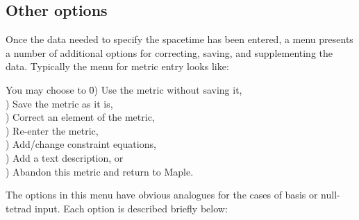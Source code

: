 \documentclass{article}
\begin{document}
\subsection{Other options}
%
Once the data needed to specify the spacetime has been entered, a menu presents
a number of additional options for correcting, saving, and supplementing the
data. Typically the menu for metric entry looks like:
\begin{ttfamily}
  \begin{tabbing}
    You may choose to \= 0) Use the metric without saving it, \\
                      ) Save the metric as it is, \\
                      ) Correct an element of the metric, \\ 
                      ) Re-enter the metric, \\
                      ) Add/change constraint equations, \\ 
                      ) Add a text description, or \\
                      ) Abandon this metric and return to Maple.
  \end{tabbing}
\end{ttfamily}
The options in this menu have obvious analogues for the cases of basis or
null-tetrad input. Each option is described briefly below:
\end{document}
